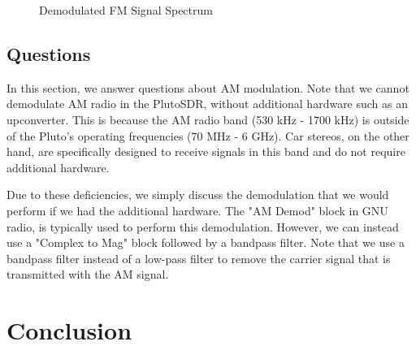 \documentclass{article}
\begin{document}
\begin{figure}[H]
	\centerline{}
	\caption{Demodulated FM Signal Spectrum}
	\label{fig::fm_radio_user_demod_spectrum}
\end{figure}

\subsection{Questions}

In this section, we answer questions about AM modulation. Note that we cannot demodulate AM radio in the PlutoSDR, without additional hardware such as an upconverter. This is because the AM radio band (530 kHz - 1700 kHz) is outside of the Pluto's operating frequencies (70 MHz - 6 GHz). Car stereos, on the other hand, are specifically designed to receive signals in this band and do not require additional hardware.

Due to these deficiencies, we simply discuss the demodulation that we would perform if we had the additional hardware. The "AM Demod" block in GNU radio, is typically used to perform this demodulation. However, we can instead use a "Complex to Mag" block followed by a bandpass filter. Note that we use a bandpass filter instead of a low-pass filter to remove the carrier signal that is transmitted with the AM signal.
  
\section{Conclusion}

%
%
	
\end{document}
